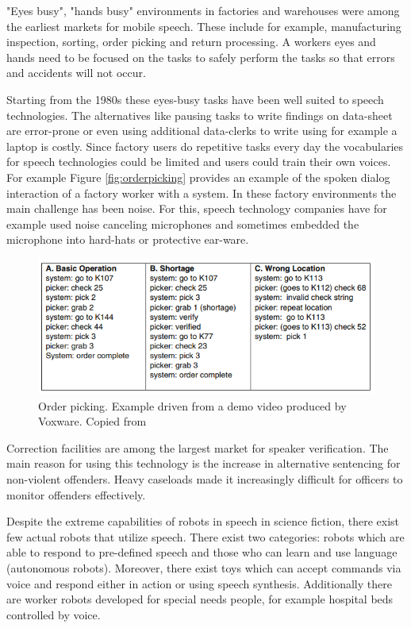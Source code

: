 \documentclass[11pt,a4paper,oneside,article]{memoir}
\begin{document}
"Eyes busy", "hands busy" environments in factories and warehouses were among the earliest markets for mobile speech. These include for example, manufacturing inspection, sorting, order picking and return processing. A workers eyes and hands need to be focused on the tasks to safely perform the tasks so that errors and accidents will not occur. \cite{markowitz}

Starting from the 1980s these eyes-busy tasks have been well suited to speech technologies. The alternatives like pausing tasks to write findings on data-sheet are error-prone or even using additional data-clerks to write using for example a laptop is costly. Since factory users do repetitive tasks every day the vocabularies for speech technologies could be limited and users could train their own voices. For example Figure \vref{fig:orderpicking} provides an example of the spoken dialog interaction of a factory worker with a system. In these factory environments the main challenge has been noise. For this, speech technology companies have for example used noise canceling microphones and sometimes embedded the microphone into hard-hats or protective ear-ware. \cite{markowitz}

\begin{figure}[h]
  \includegraphics[width=15cm]{orderpicking}
  \caption{Order picking. Example driven from a demo video produced by Voxware. Copied from \cite{markowitz}}
  \label{fig:orderpicking}
\end{figure}

Correction facilities are among the largest market for speaker verification. The main reason for using this technology is the increase in alternative sentencing for non-violent offenders. Heavy caseloads made it increasingly difficult for officers to monitor offenders effectively. \cite{markowitz}

Despite the extreme capabilities of robots in speech in science fiction, there exist few actual robots that utilize speech. There exist two categories: robots which are able to respond to pre-defined speech and those who can learn and use language (autonomous robots). Moreover, there exist toys which can accept commands via voice and respond either in action or using speech synthesis. Additionally there are worker robots developed for special needs people, for example hospital beds controlled by voice. \cite{markowitz}
\end{document}
